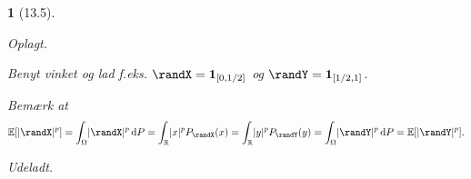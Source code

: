 \documentclass[a4paper, 11pt, article, danish, oneside]{memoir}
\newcommand{\reals}{\mathbb{R}}
\newcommand{\blank}{\mathrel{\;\cdot\;}}
\newcommand{\blankifempty}[1]{\ifstrempty{#1}{\blank}{#1}}
\DeclarePairedDelimiter{\auxdelimlvert}{\lvert}{\rvert}
\newcommand{\abs}[2][]{\auxdelimlvert[#1]{\blankifempty{#2}}}
\DeclarePairedDelimiter{\auxdelimbracket}{[}{]}
\newcommand{\expval}[2][]{\mathbb{E}\auxdelimbracket[#1]{#2}}
\newcommand{\dif}{\mathop{}\!\mathrm{d}}
\newcommand{\indicator}[1]{\mathbf{1}_{#1}}
\newcommand{\pencilsymbol}{\raisebox{-2pt}{\normalfont\PencilLeft}}
\theoremstyle{changedotcustomnumber}
\theoremstyle{changedotbreakcustomnumber}
\newtheorem{opgavebreak}{\pencilsymbol}
\begin{document}
\begin{opgavebreak}[13.5]
\begin{solutionsec}
    \item Oplagt.

    \item Benyt vinket og lad f.eks. $\randX = \indicator{[0,1/2]}$ og $\randY = \indicator{[1/2,1]}$.

    \item Bemærk at
    \begin{equation*}
        \expval{\abs{\randX}^p}
            = \int_\Omega \abs{\randX}^p \dif P
            = \int_\reals \abs{x}^p P_\randX(x)
            = \int_\reals \abs{y}^p P_\randY(y)
            = \int_\Omega \abs{\randY}^p \dif P
            = \expval{\abs{\randY}^p}.
    \end{equation*}

    \item Udeladt.
\end{solutionsec}
\end{opgavebreak}
\end{document}
